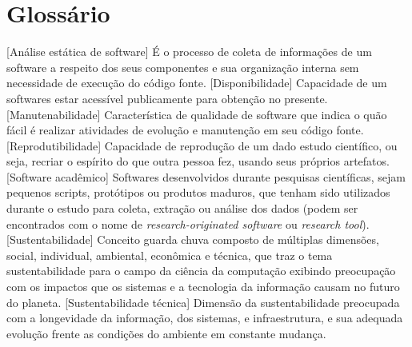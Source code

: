 \chapter*{Glossário}

\begin{acronym}
  [Análise estática de software]{
    É o processo de coleta de informações de um software a respeito dos seus
    componentes e sua organização interna sem necessidade de execução do código
    fonte.
  }
  [Disponibilidade]{
    Capacidade de um softwares estar acessível publicamente para obtenção no
    presente.
  }
  [Manutenabilidade]{
    Característica de qualidade de software que indica o quão fácil é
    realizar atividades de evolução e manutenção em seu código fonte.
  }
  [Reprodutibilidade]{
    Capacidade de reprodução de um dado estudo científico, ou seja, recriar
    o espírito do que outra pessoa fez, usando seus próprios artefatos.
  }
  [Software acadêmico]{
    Softwares desenvolvidos durante pesquisas científicas, sejam pequenos
    scripts, protótipos ou produtos maduros, que tenham sido utilizados durante
    o estudo para coleta, extração ou análise dos dados (podem ser encontrados
    com o nome de {\it research-originated software} ou {\it research tool}).
  }
  [Sustentabilidade]{
    Conceito guarda chuva composto de múltiplas dimensões, social, individual,
    ambiental, econômica e técnica, que traz o tema sustentabilidade para o campo da
    ciência da computação exibindo preocupação com os impactos que os sistemas
    e a tecnologia da informação causam no futuro do planeta.
  }
  [Sustentabilidade técnica]{
    Dimensão da sustentabilidade preocupada com a longevidade da informação,
    dos sistemas, e infraestrutura, e sua adequada evolução frente as condições
    do ambiente em constante mudança.
  }
\end{acronym}
